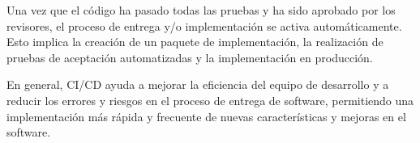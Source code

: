 Una vez que el código ha pasado todas las pruebas y ha sido aprobado por los revisores, el proceso de entrega y/o implementación se activa automáticamente. Esto implica la creación de un paquete de implementación, la realización de pruebas de aceptación automatizadas y la implementación en producción.

En general, CI/CD ayuda a mejorar la eficiencia del equipo de desarrollo y a reducir los errores y riesgos en el proceso de entrega de software, permitiendo una implementación más rápida y frecuente de nuevas características y mejoras en el software.